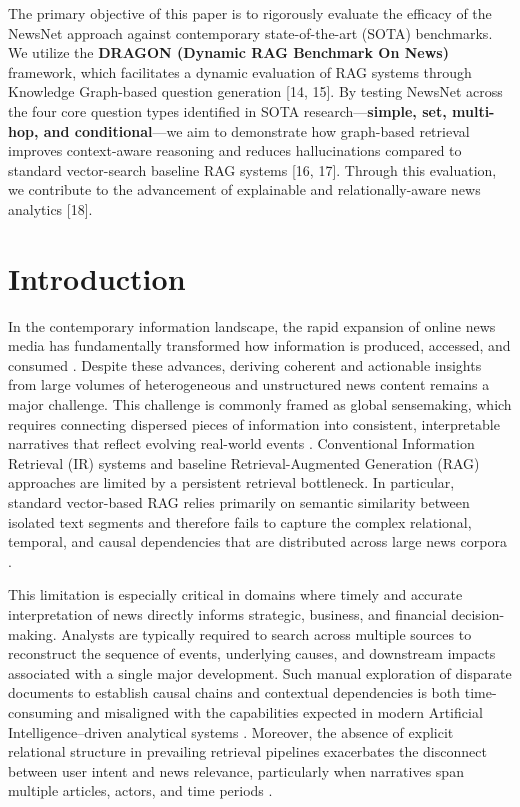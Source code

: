 \documentclass[preprint,10pt]{article}
\begin{document}
{The primary objective of this paper is to rigorously evaluate the efficacy of the NewsNet approach against contemporary state-of-the-art (SOTA) benchmarks. We utilize the \textbf{DRAGON (Dynamic RAG Benchmark On News)} framework, which facilitates a dynamic evaluation of RAG systems through Knowledge Graph-based question generation [14, 15]. By testing NewsNet across the four core question types identified in SOTA research—\textbf{simple, set, multi-hop, and conditional}—we aim to demonstrate how graph-based retrieval improves context-aware reasoning and reduces hallucinations compared to standard vector-search baseline RAG systems [16, 17]. Through this evaluation, we contribute to the advancement of explainable and relationally-aware news analytics [18].

}

\section{Introduction}

In the contemporary information landscape, the rapid expansion of online news media has fundamentally transformed how information is produced, accessed, and consumed \cite{Mosolygo2025}. Despite these advances, deriving coherent and actionable insights from large volumes of heterogeneous and unstructured news content remains a major challenge. This challenge is commonly framed as global sensemaking, which requires connecting dispersed pieces of information into consistent, interpretable narratives that reflect evolving real-world events \cite{Kim2025}. Conventional Information Retrieval (IR) systems and baseline Retrieval-Augmented Generation (RAG) approaches \cite{Lewis2020} are limited by a persistent retrieval bottleneck. In particular, standard vector-based RAG relies primarily on semantic similarity between isolated text segments and therefore fails to capture the complex relational, temporal, and causal dependencies that are distributed across large news corpora \cite{Kim2025, Mosolygo2025, BichTram2025}.

This limitation is especially critical in domains where timely and accurate interpretation of news directly informs strategic, business, and financial decision-making. Analysts are typically required to search across multiple sources to reconstruct the sequence of events, underlying causes, and downstream impacts associated with a single major development. Such manual exploration of disparate documents to establish causal chains and contextual dependencies is both time-consuming and misaligned with the capabilities expected in modern Artificial Intelligence–driven analytical systems \cite{Haque2025}. Moreover, the absence of explicit relational structure in prevailing retrieval pipelines exacerbates the disconnect between user intent and news relevance, particularly when narratives span multiple articles, actors, and time periods \cite{Kim2025}.
\end{document}
